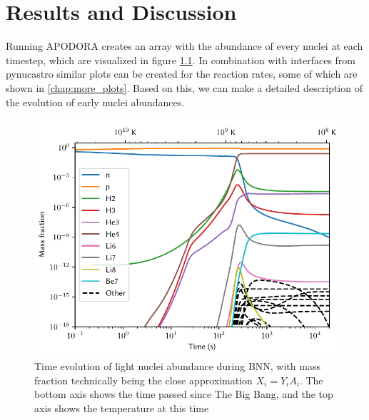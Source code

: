 \chapter{Results and Discussion}\label{chap:Results}
\noindent Running APODORA creates an array with the abundance of every nuclei at each timestep, which are visualized in figure \ref{fig:lightXevo}. 
In combination with interfaces from pynucastro similar plots can be created for the reaction rates, some of which are shown in \cref{chap:more_plots}. Based on this, we can make a detailed description of the evolution of early nuclei abundances. 
\begin{figure}[ht]
    \includegraphics[width=5.1in]{figures/abundancelight.pdf}
    \caption{Time evolution of light nuclei abundance during BNN, with mass fraction technically being the close approximation $X_i=Y_i A_i$. The bottom axis shows the time passed since The Big Bang, and the top axis shows the temperature at this time}
    \label{fig:lightXevo}
\end{figure}


